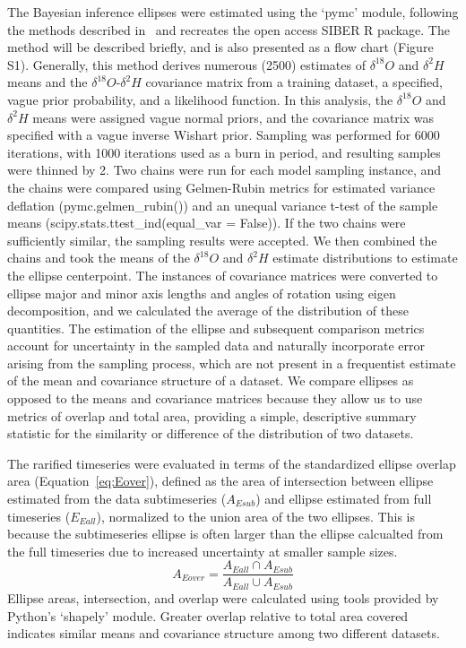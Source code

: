 \documentclass[draft, linenumbers]{agujournal2018}
\begin{document}
The Bayesian inference ellipses were estimated using the `pymc' module, following the methods described in~\citet{Jackson2011} and recreates the open access SIBER R package. The method will be described briefly, and is also presented as a flow chart (Figure S1). Generally, this method derives numerous (2500) estimates of $\delta^{18}O$ and $\delta^{2}H$ means and the $\delta^{18}O$-$\delta^{2}H$ covariance matrix from a training dataset, a specified, vague prior probability, and a likelihood function. In this analysis, the $\delta^{18}O$ and $\delta^{2}H$ means were assigned vague normal priors, and the covariance matrix was specified with a vague inverse Wishart prior. Sampling was performed for 6000 iterations, with 1000 iterations used as a burn in period, and resulting samples were thinned by 2.  Two chains were run for each model sampling instance, and the chains were compared using Gelmen-Rubin metrics for estimated variance deflation (pymc.gelmen\_rubin()) and an unequal variance t-test of the sample means (scipy.stats.ttest\_ind(equal\_var = False)). If the two chains were sufficiently similar, the sampling results were accepted. We then combined the chains and took the means of the $\delta^{18}O$ and $\delta^{2}H$ estimate distributions to estimate the ellipse centerpoint. The instances of covariance matrices were converted to ellipse major and minor axis lengths and angles of rotation using eigen decomposition, and we calculated the average of the distribution of these quantities. The estimation of the ellipse and subsequent comparison metrics account for uncertainty in the sampled data and naturally incorporate error arising from the sampling process, which are not present in a frequentist estimate of the mean and covariance structure of a dataset. We compare ellipses as opposed to the means and covariance matrices because they allow us to use metrics of overlap and total area, providing a simple, descriptive summary statistic for the similarity or difference of the distribution of two datasets.

The rarified timeseries were evaluated in terms of the standardized ellipse overlap area (Equation~\ref{eq:Eover}), defined as the area of intersection between ellipse estimated from the data subtimeseries ($A_{Esub}$) and ellipse estimated from full timeseries ($E_{Eall}$), normalized to the union area of the two ellipses. This is because the subtimeseries ellipse is often larger than the ellipse calcualted from the full timeseries due to increased uncertainty at smaller sample sizes.
\begin{equation}
A_{Eover} = \frac{A_{Eall}\cap A_{Esub}}{A_{Eall} \cup A_{Esub}}
\label{eq:Eover}
\end{equation}
Ellipse areas, intersection, and overlap were calculated using tools provided by Python's `shapely' module. Greater overlap relative to total area covered indicates similar means and covariance structure among two different datasets.
\end{document}

